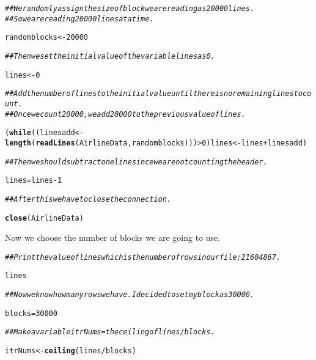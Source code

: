 \documentclass[english]{article}\usepackage[]{graphicx}\usepackage[]{color}
\makeatletter
\newcommand{\hlnum}[1]{\textcolor[rgb]{0.686,0.059,0.569}{#1}}%
\newcommand{\hlcom}[1]{\textcolor[rgb]{0.678,0.584,0.686}{\textit{#1}}}%
\newcommand{\hlopt}[1]{\textcolor[rgb]{0,0,0}{#1}}%
\newcommand{\hlstd}[1]{\textcolor[rgb]{0.345,0.345,0.345}{#1}}%
\newcommand{\hlkwa}[1]{\textcolor[rgb]{0.161,0.373,0.58}{\textbf{#1}}}%
\newcommand{\hlkwb}[1]{\textcolor[rgb]{0.69,0.353,0.396}{#1}}%
\newcommand{\hlkwd}[1]{\textcolor[rgb]{0.737,0.353,0.396}{\textbf{#1}}}%
\newenvironment{kframe}{%
 \def\at@end@of@kframe{}%
 \ifinner\ifhmode%
  \def\at@end@of@kframe{\end{minipage}}%
  \begin{minipage}{\columnwidth}%
 \fi\fi%
 \def\FrameCommand##1{\hskip\@totalleftmargin \hskip-\fboxsep
 \colorbox{shadecolor}{##1}\hskip-\fboxsep
     \hskip-\linewidth \hskip-\@totalleftmargin \hskip\columnwidth}%
 \MakeFramed {\advance\hsize-\width
   \@totalleftmargin\z@ \linewidth\hsize
   \@setminipage}}%
 {\par\unskip\endMakeFramed%
 \at@end@of@kframe}
\newenvironment{knitrout}{}{} %
\makeatother
\begin{document}
\begin{knitrout}
\color{fgcolor}\begin{kframe}
\begin{alltt}
\hlcom{## We randomly assign the size of block we are reading as 20000 lines.}
\hlcom{## So we are reading 20000 lines at a time.}

\hlstd{randomblocks} \hlkwb{<-} \hlnum{20000}

\hlcom{## Then we set the initial value of the variable lines as 0.}

\hlstd{lines} \hlkwb{<-} \hlnum{0}

\hlcom{## Add the number of lines to the initial value until there is no remaining lines to count. }
\hlcom{##Once we count 20000, we add 20000 to the previous value of lines.}

\hlstd{(}\hlkwa{while}\hlstd{((linesadd} \hlkwb{<-} \hlkwd{length}\hlstd{(}\hlkwd{readLines}\hlstd{(AirlineData,randomblocks)))} \hlopt{>} \hlnum{0} \hlstd{)    lines} \hlkwb{<-} \hlstd{lines}\hlopt{+}\hlstd{linesadd)}

\hlcom{## Then we should subtract one line since we are not counting the header.}

\hlstd{lines}\hlkwb{=}\hlstd{lines}\hlopt{-}\hlnum{1}

\hlcom{## After this we have to close the connection.}

\hlkwd{close}\hlstd{(AirlineData)}
\end{alltt}
\end{kframe}
\end{knitrout}

Now we choose the number of blocks we are going to use.

\begin{knitrout}
\color{fgcolor}\begin{kframe}
\begin{alltt}
\hlcom{## Print the value of lines which is the number of rows in our file; 21604867.}

\hlstd{lines}

\hlcom{## Now we know how many rows we have. I decided to set my block as 30000.}

\hlstd{blocks}\hlkwb{=}\hlnum{30000}

\hlcom{## Make a variable itrNums=the ceiling of lines/blocks.}

\hlstd{itrNums} \hlkwb{<-} \hlkwd{ceiling}\hlstd{(lines}\hlopt{/}\hlstd{blocks)}
\end{alltt}
\end{kframe}
\end{knitrout}
\end{document}
